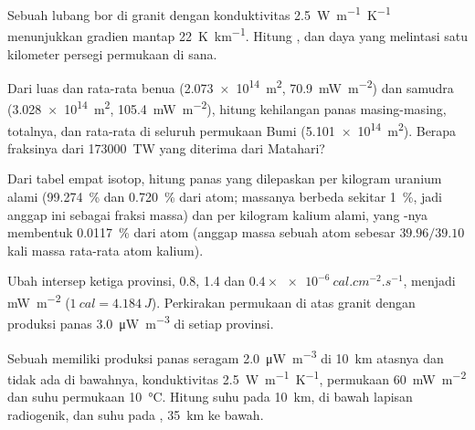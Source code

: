 \begin{exercise}[$\star$]\label{exo:b1:heat-budget:1}
Sebuah lubang bor di granit dengan konduktivitas \qty{2.5}{W.m^{-1}.K^{-1}} menunjukkan gradien mantap \qty{22}{K.km^{-1}}. Hitung , dan daya yang melintasi satu kilometer persegi permukaan di sana.
\end{exercise}

\begin{exercise}[$\star$]\label{exo:b1:heat-budget:2}
Dari luas dan  rata-rata benua (\qty{2.073e14}{m^2}, \qty{70.9}{mW.m^{-2}}) dan samudra (\qty{3.028e14}{m^2}, \qty{105.4}{mW.m^{-2}}), hitung kehilangan panas masing-masing, totalnya, dan  rata-rata di seluruh permukaan Bumi (\qty{5.101e14}{m^2}). Berapa fraksinya dari \qty{173000}{TW} yang diterima dari Matahari?
\end{exercise}

\begin{exercise}[$\star$]\label{exo:b1:heat-budget:3}
Dari tabel empat isotop, hitung panas yang dilepaskan per kilogram uranium alami (\qty{99.274}{\percent}  dan \qty{0.720}{\percent}  dari atom; massanya berbeda sekitar \qty{1}{\percent}, jadi anggap ini sebagai fraksi massa) dan per kilogram kalium alami, yang -nya membentuk \qty{0.0117}{\percent} dari atom (anggap massa sebuah atom  sebesar $39.96/39.10$ kali massa rata-rata atom kalium).
\end{exercise}

\begin{exercise}[$\star$]\label{exo:b1:heat-budget:4}
Ubah intersep ketiga provinsi, 0.8, 1.4 dan $0.4\times\qty{e-6}{cal.cm^{-2}.s^{-1}}$, menjadi \unit{mW.m^{-2}} ($\qty{1}{cal} = \qty{4.184}{J}$). Perkirakan  permukaan di atas granit dengan produksi panas \qty{3.0}{\micro W.m^{-3}} di setiap provinsi.
\end{exercise}

\begin{exercise}[$\star\star$]\label{exo:b1:heat-budget:5}
Sebuah  memiliki produksi panas seragam \qty{2.0}{\micro W.m^{-3}} di \qty{10}{km} atasnya dan tidak ada di bawahnya, konduktivitas \qty{2.5}{W.m^{-1}.K^{-1}},  permukaan \qty{60}{mW.m^{-2}} dan suhu permukaan \qty{10}{\degreeCelsius}. Hitung suhu pada \qty{10}{km},  di bawah lapisan radiogenik, dan suhu pada , \qty{35}{km} ke bawah.
\end{exercise}

